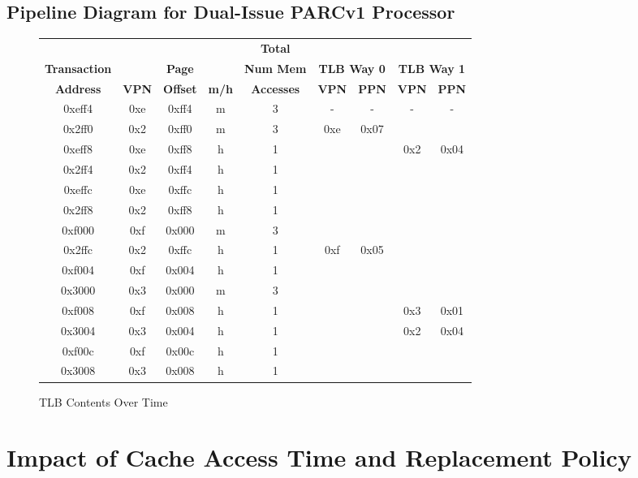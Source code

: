 \documentclass[10pt]{article}
\begin{document}
\subsection{Pipeline Diagram for Dual-Issue PARCv1 Processor}
\begin{figure}[H]
\centering
{
\begin{tabular}{@{\extracolsep{3pt}}ccccccccc@{}}
\hline
& & & & \textbf{Total} & & & & \\
\textbf{Transaction} & & \textbf{Page} & & \textbf{Num Mem} & \multicolumn{2}{c}{\textbf{TLB Way 0}} & \multicolumn{2}{c}{\textbf{TLB Way 1}} \\
\cline{6-7}
\cline{8-9}
\textbf{Address} & \textbf{VPN} & \textbf{Offset} & \textbf{m/h} & \textbf{Accesses} & \textbf{VPN} & \textbf{PPN} & \textbf{VPN} & \textbf{PPN} \\
\hline
0xeff4 & 0xe & 0xff4 & m & 3 & - & - & - & - \\
\hline
0x2ff0 & 0x2 & 0xff0 & m & 3 & 0xe & 0x07 & & \\
\hline
0xeff8 & 0xe & 0xff8 & h & 1 &  &  & 0x2 & 0x04 \\
\hline
0x2ff4 & 0x2 & 0xff4 & h & 1 & & & & \\
\hline
0xeffc & 0xe & 0xffc & h & 1 & & & & \\
\hline
0x2ff8 & 0x2 & 0xff8 & h & 1 & & & & \\
\hline
0xf000 & 0xf & 0x000 & m & 3 & & & & \\
\hline
0x2ffc & 0x2 & 0xffc & h & 1 & 0xf & 0x05 & & \\
\hline
0xf004 & 0xf & 0x004 & h & 1 & & & & \\
\hline
0x3000 & 0x3 & 0x000 & m & 3 & & & & \\
\hline
0xf008 & 0xf & 0x008 & h & 1 & & & 0x3 & 0x01 \\
\hline
0x3004 & 0x3 & 0x004 & h & 1 & & & 0x2 & 0x04 \\
\hline
0xf00c & 0xf & 0x00c & h & 1 & & & & \\
\hline
0x3008 & 0x3 & 0x008 & h & 1 & & & & \\
\hline
\end{tabular}
}
\caption{TLB Contents Over Time}
\end{figure}

\cleardoublepage
\section{Impact of Cache Access Time and Replacement Policy}
\end{document}
